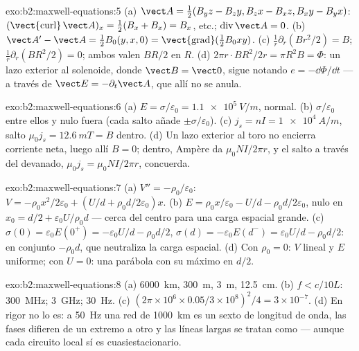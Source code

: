 \begin{solution}{exo:b2:maxwell-equations:5}
(a) $\vect A = \tfrac12(B_yz - B_zy, B_zx - B_xz, B_xy - B_yx)$: $(\operatorname{\vect{curl}}
\vect A)_x = \tfrac12(B_x + B_x) = B_x$, etc.; $\operatorname{div}\vect A = 0$. (b)
$\vect A' - \vect A = \tfrac12B_0(y, x, 0) = \operatorname{\vect{grad}}(\tfrac12B_0xy)$. (c)
$\frac1r\partial_r(Br^2/2) = B$; $\frac1r\partial_r(BR^2/2) = 0$; ambos valen $BR/2$ en
$R$. (d) $2\pi r\cdot BR^2/2r = \pi R^2B = \Phi$: un lazo exterior al solenoide,
donde $\vect B = \vect 0$, sigue notando $e = -\dd\Phi/\dd t$ --- a través de $\vect E =
-\partial_t\vect A$, que allí no se anula.
\end{solution}

\begin{solution}{exo:b2:maxwell-equations:6}
(a) $E = \sigma/\varepsilon_0 = \qty{1.1e5}{V/m}$, normal. (b) $\sigma/\varepsilon_0$ entre ellos y nulo
fuera (cada salto añade $\pm\sigma/\varepsilon_0$). (c) $j_s = nI = \qty{1e4}{A/m}$, salto
$\mu_0j_s = \qty{12.6}{mT} = B$ dentro. (d) Un lazo exterior al toro no encierra
corriente neta, luego allí $B = 0$; dentro, Ampère da $\mu_0NI/2\pi r$,
y el salto a través del devanado, $\mu_0j_s = \mu_0NI/2\pi r$, concuerda.
\end{solution}

\begin{solution}{exo:b2:maxwell-equations:7}
(a) $V'' = -\rho_0/\varepsilon_0$: $V = -\rho_0x^2/2\varepsilon_0 + (U/d + \rho_0d/2\varepsilon_0)x$. (b)
$E = \rho_0x/\varepsilon_0 - U/d - \rho_0d/2\varepsilon_0$, nulo en $x_0 = d/2 + \varepsilon_0U/\rho_0d$
--- cerca del centro para una carga espacial grande. (c) $\sigma(0) = \varepsilon_0E(0^+) =
-\varepsilon_0U/d - \rho_0d/2$, $\sigma(d) = -\varepsilon_0E(d^-) = \varepsilon_0U/d - \rho_0d/2$: en conjunto
$-\rho_0d$, que neutraliza la carga espacial. (d) Con $\rho_0 = 0$: $V$ lineal y
$E$ uniforme; con $U = 0$: una parábola con su máximo en $d/2$.
\end{solution}

\begin{solution}{exo:b2:maxwell-equations:8}
(a) \qty{6000}{km}, \qty{300}{m}, \qty{3}{m}, \qty{12.5}{cm}. (b) $f < c/10L$:
\qty{300}{MHz}; \qty{3}{GHz}; \qty{30}{Hz}. (c) $(2\pi \times 10^6 \times 0.05/3 \times 10^8)^2/4 =
3 \times 10^{-7}$. (d) En rigor no lo es: a \qty{50}{Hz} una red de \qty{1000}{km} es
un sexto de longitud de onda, las fases difieren de un extremo a otro y
las líneas largas se tratan como  --- aunque cada
circuito local sí es cuasiestacionario.
\end{solution}

